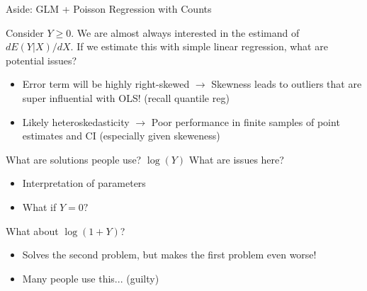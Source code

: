 \documentclass[notes,11pt, aspectratio=169]{beamer}
\newenvironment{wideitemize}{\itemize\addtolength{\itemsep}{10pt}}{\enditemize}
\begin{document}
  \begin{frame}{Aside: GLM + Poisson Regression with Counts}
    \begin{wideitemize}
    \item Consider $Y \geq 0$. We are almost always interested in the
      estimand of $dE(Y | X) / dX$. If we estimate this with simple linear regression, what are potential issues?
      \begin{itemize}
      \item Error term will be highly right-skewed $\rightarrow$
        Skewness leads to outliers that are super influential with
        OLS! (recall quantile reg)
      \item Likely heteroskedasticity $\rightarrow$ Poor performance
        in finite samples of point estimates and CI (especially given
        skeweness)
      \end{itemize}
    \item What are solutions people use? $\log(Y)$ What are issues here?
      \begin{itemize}
      \item Interpretation of parameters
      \item What if $Y = 0?$
      \end{itemize}
    \item What about $\log(1+Y)$?
      \begin{itemize}
      \item Solves the second problem, but makes the first problem even worse!
      \item Many people use this... (guilty)
      \end{itemize}
    \end{wideitemize}
  \end{frame}
\end{document}
